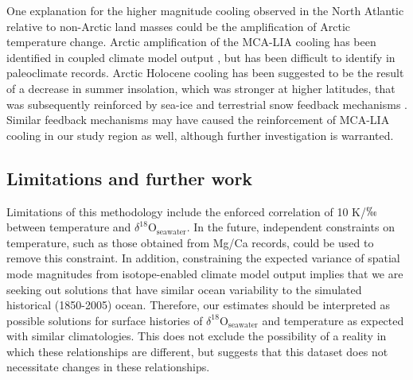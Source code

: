 \documentclass[draft]{agujournal2019}
\begin{document}
One explanation for the higher magnitude cooling observed in the North Atlantic relative to non-Arctic land masses could be the amplification of Arctic temperature change.  Arctic amplification of the MCA-LIA cooling has been identified in coupled climate model output \cite{ottobliesner16}, but has been difficult to identify in paleoclimate records. Arctic Holocene cooling has been suggested to be the result of a decrease in summer insolation, which was stronger at higher latitudes, that was subsequently reinforced by sea-ice and terrestrial snow feedback mechanisms \cite[]{Kaufman2009}. Similar feedback mechanisms may have caused the reinforcement of MCA-LIA cooling in our study region as well, although further investigation is warranted. 
\subsection{Limitations and further work}
Limitations of this methodology include the enforced correlation of 10 K/$\permil$ between temperature and $\delta^{18}\mathrm{O}_{\mathrm{seawater}}$. In the future, independent constraints on temperature, such as those obtained from Mg/Ca records, could be used to remove this constraint. In addition, constraining the expected variance of spatial mode magnitudes from isotope-enabled climate model output implies that we are seeking out solutions that have similar ocean variability to the simulated historical (1850-2005) ocean. Therefore, our estimates should be interpreted as possible solutions for surface histories of $\delta^{18}\mathrm{O}_{\mathrm{seawater}}$ and temperature as expected with similar climatologies. This does not exclude the possibility of a reality in which these relationships are different, but suggests that this dataset does not necessitate changes in these relationships. 
\end{document}
